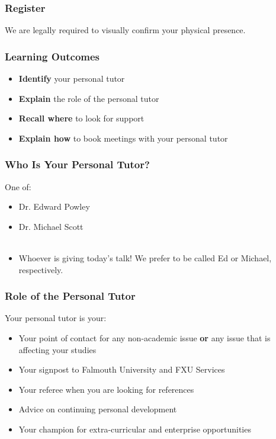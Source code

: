 \begin{frame}
	\frametitle{Register}
	
	We are legally required to visually confirm your physical presence.
	
\end{frame}

\begin{frame}
	\frametitle{Learning Outcomes}
	\begin{itemize}
		\item \textbf{Identify} your personal tutor
		\item \textbf{Explain} the role of the personal tutor
		\item \textbf{Recall where} to look for support
		\item \textbf{Explain how} to book meetings with your personal tutor
	\end{itemize}
\end{frame}

\begin{frame}
	\frametitle{Who Is Your Personal Tutor?}
	One of: \\	
	\begin{itemize}
		\item Dr. Edward Powley
		\item Dr. Michael Scott
		\\~\\
		\item Whoever is giving today's talk! We prefer to be called Ed or Michael, respectively.
	\end{itemize}
\end{frame}

\begin{frame}
	\frametitle{Role of the Personal Tutor}	
	
	Your personal tutor is your:
	
	\begin{itemize}
		\item Your point of contact for any non-academic issue \textbf{or} any issue that is affecting your studies
		\item Your signpost to Falmouth University and FXU Services
		\item Your referee when you are looking for references
		\item Advice on continuing personal development
		\item Your champion for extra-curricular and enterprise opportunities 
	\end{itemize}
\end{frame}

